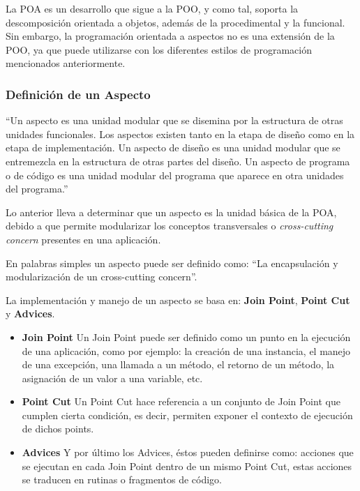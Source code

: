 La POA es un desarrollo que sigue a la POO, y como tal, soporta la
descomposición orientada a objetos, además de la procedimental y la funcional. Sin
embargo, la programación orientada a aspectos no es una extensión de la POO, ya
que puede utilizarse con los diferentes estilos de programación mencionados
anteriormente.


\subsubsection{Definición de un Aspecto}
	“Un aspecto es una unidad modular que se disemina por la estructura de
	otras unidades funcionales. Los aspectos existen tanto en la etapa de
	diseño como en la etapa de implementación. Un aspecto de diseño es
	una unidad modular que se entremezcla en la estructura de otras partes
	del diseño. Un aspecto de programa o de código es una unidad modular
	del programa que aparece en otra unidades del programa.” \cite{Kicz97a}

\bigskip

Lo anterior lleva a determinar que un aspecto es la unidad básica de la
POA, debido a que permite modularizar los conceptos transversales
o \emph{cross-cutting concern} presentes en una aplicación.

En palabras simples un aspecto puede ser definido como: “La encapsulación y
modularización de un cross-cutting concern”.

\bigskip

La implementación y manejo de un aspecto se basa en: {\bf Join Point}, {\bf
Point Cut} y {\bf Advices}.

\begin {itemize}

	\item{\bf Join Point} Un Join Point puede ser definido como un punto en la
	ejecución de una aplicación, como por ejemplo: la creación de una instancia, el manejo de una
	excepción, una llamada a un método, el retorno de un método, la asignación de
	un valor a una variable, etc.
	
	\item{\bf Point Cut} Un Point Cut hace referencia a un conjunto de Join
	Point que cumplen cierta condición, es decir, permiten exponer el contexto de
	ejecución de dichos points.
	
	\item{\bf Advices} Y por último los Advices, éstos pueden definirse
	como: acciones que se ejecutan en cada Join Point dentro de un mismo Point Cut,
	estas acciones se traducen en rutinas o fragmentos de código.

\end{itemize}




